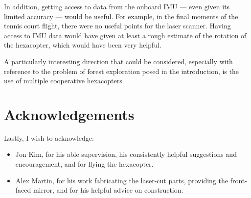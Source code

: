 \documentclass[12pt,oneside,a4paper]{book}
\begin{document}
In addition, getting access to data from the onboard IMU --- even
given its limited accuracy --- would be useful. For example, in the
final moments of the tennis court flight, there were no useful points
for the laser scanner. Having access to IMU data would have given at
least a rough estimate of the rotation of the hexacopter, which would
have been very helpful.

A particularly interesting direction that could be considered,
especially with reference to the problem of forest exploration posed
in the introduction, is the use of multiple cooperative
hexacopters.

\section{Acknowledgements}
\label{sec:acknowledgements}

Lastly, I wish to acknowledge:

\begin{itemize}
\item Jon Kim, for his able supervision, his consistently helpful
  suggestions and encouragement, and for flying the hexacopter.
\item Alex Martin, for his work fabricating the laser-cut parts,
  providing the front-faced mirror, and for his helpful advice on
  construction.
\end{itemize}


%

\backmatter


\end{document}
